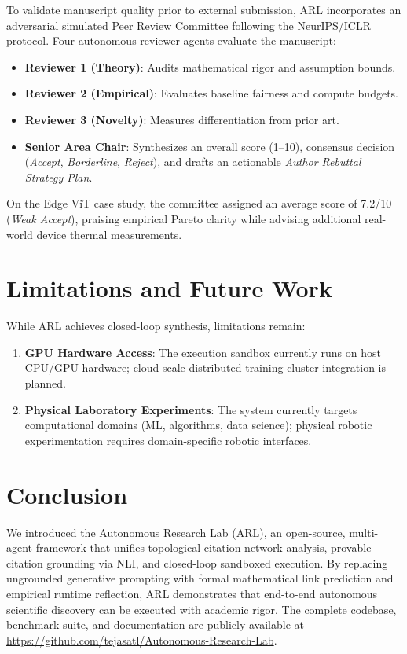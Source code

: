 \documentclass[10pt,twocolumn,letterpaper]{article}
\begin{document}
To validate manuscript quality prior to external submission, ARL incorporates an adversarial simulated Peer Review Committee following the NeurIPS/ICLR protocol. Four autonomous reviewer agents evaluate the manuscript:
\begin{itemize}
    \item \textbf{Reviewer 1 (Theory)}: Audits mathematical rigor and assumption bounds.
    \item \textbf{Reviewer 2 (Empirical)}: Evaluates baseline fairness and compute budgets.
    \item \textbf{Reviewer 3 (Novelty)}: Measures differentiation from prior art.
    \item \textbf{Senior Area Chair}: Synthesizes an overall score (1--10), consensus decision (\textit{Accept}, \textit{Borderline}, \textit{Reject}), and drafts an actionable \textit{Author Rebuttal Strategy Plan}.
\end{itemize}
On the Edge ViT case study, the committee assigned an average score of 7.2/10 (\textit{Weak Accept}), praising empirical Pareto clarity while advising additional real-world device thermal measurements.

\section{Limitations and Future Work}

While ARL achieves closed-loop synthesis, limitations remain:
\begin{enumerate}
    \item \textbf{GPU Hardware Access}: The execution sandbox currently runs on host CPU/GPU hardware; cloud-scale distributed training cluster integration is planned.
    \item \textbf{Physical Laboratory Experiments}: The system currently targets computational domains (ML, algorithms, data science); physical robotic experimentation requires domain-specific robotic interfaces.
\end{enumerate}

\section{Conclusion}

We introduced the Autonomous Research Lab (ARL), an open-source, multi-agent framework that unifies topological citation network analysis, provable citation grounding via NLI, and closed-loop sandboxed execution. By replacing ungrounded generative prompting with formal mathematical link prediction and empirical runtime reflection, ARL demonstrates that end-to-end autonomous scientific discovery can be executed with academic rigor. The complete codebase, benchmark suite, and documentation are publicly available at \url{https://github.com/tejasatl/Autonomous-Research-Lab}.
\end{document}
